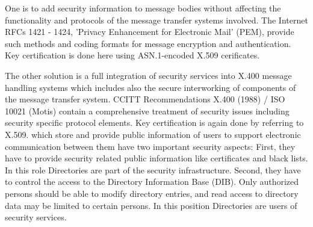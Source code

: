    One is to add security information to message bodies without affecting
   the functionality and protocols of the message transfer systems involved.  
   The Internet RFCs 1421 - 1424, 'Privacy Enhancement for
   Electronic Mail' (PEM), provide such methods and
   coding formats for message encryption and authentication. Key certification is done here using 
   ASN.1-encoded X.509 cerificates. 

   The other solution is a full integration of security services into X.400 message handling systems which
   includes also the secure interworking of components of the message 
   transfer system.
   CCITT Recommendations X.400 (1988) / ISO 10021 (Motis) contain a comprehensive
   treatment of security issues including security specific protocol elements. 
   Key certification is again done by referring to X.509.
 which store and provide public information of users to support
   electronic communication between them have two important security aspects:
   First, they have to provide
   security related public information like certificates and black lists.
   In this role Directories are part of the security infrastructure.
   Second, they have to control the access to the Directory Information
   Base (DIB). Only authorized
   persons should be able to modify directory entries, and read access 
   to directory
   data may be limited to certain persons. In this position Directories
   are users of security services.

